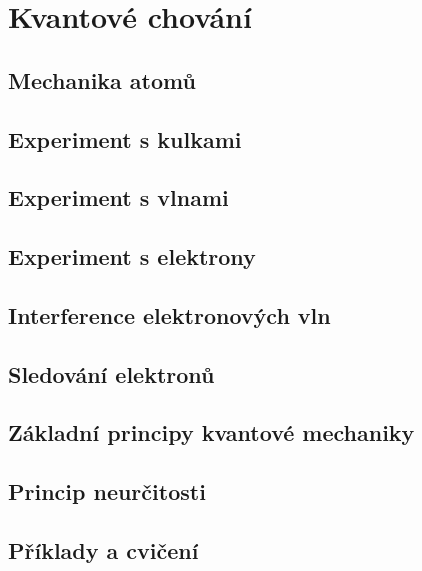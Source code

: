 \chapter{Kvantové chování}\label{fyz:IchapXXXVII}
\minitoc
  \section{Mechanika atomů}\label{fyz:IchapXXXVIIsecI}
  \section{Experiment s kulkami}\label{fyz:IchapXXXVIIsecII}
  \section{Experiment s vlnami}\label{fyz:IchapXXXVIIsecIII}
  \section{Experiment s elektrony}\label{fyz:IchapXXXVIIsecIV}
  \section{Interference elektronových vln}\label{fyz:IchapXXXVIIsecV}
  \section{Sledování elektronů}\label{fyz:IchapXXXVIIsecVI}
  \section{Základní principy kvantové mechaniky}\label{fyz:IchapXXXVIIsecVII}
  \section{Princip neurčitosti}\label{fyz:IchapXXXVIIsecVIII}
  \section{Příklady a cvičení}\label{fyz:IchapXXXVIIsecIX}